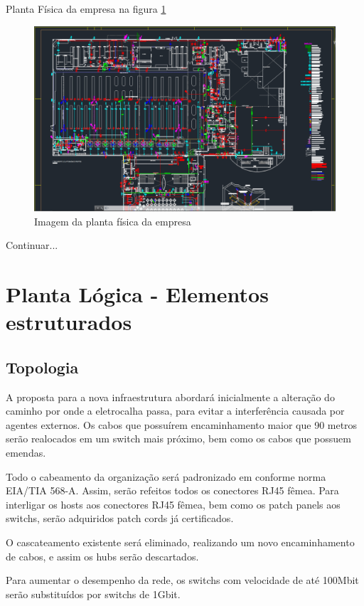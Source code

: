 \documentclass[	DIV=calc,%
							paper=a4,%
							fontsize=12pt,%
							onecolumn]{scrartcl}	 					%
\begin{document}
Planta Física da empresa na figura \ref{Fig_estrutura_predial}

\begin{figure}[h!]
	\centering
	\includegraphics[width=\textwidth]{Fig_estrutura_predial}
	\caption{Imagem da planta física da empresa}
	\label{Fig_estrutura_predial}
\end{figure}

Continuar...

\section{Planta Lógica - Elementos estruturados}


\subsection{Topologia}


A proposta para a nova infraestrutura abordará inicialmente a alteração do caminho por onde a eletrocalha passa, para evitar a interferência causada por agentes externos. Os cabos que possuírem encaminhamento maior que 90 metros serão realocados em um switch mais próximo, bem como os cabos que possuem emendas.

Todo o cabeamento da organização será padronizado em conforme norma EIA/TIA 568-A. Assim, serão refeitos todos os conectores RJ45 fêmea. Para interligar os hosts aos conectores RJ45 fêmea, bem como os patch panels aos switchs, serão adquiridos patch cords já certificados.

O cascateamento existente será eliminado, realizando um novo encaminhamento de cabos, e assim os hubs serão descartados.

Para aumentar o desempenho da rede, os switchs com velocidade de até 100Mbit serão substituídos por switchs de 1Gbit.
\end{document}
